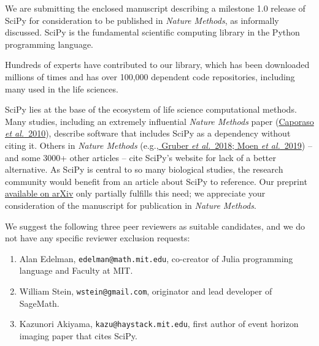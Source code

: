 \documentclass[10pt,stdletter,dateno]{newlfm}
\begin{document}
\begin{newlfm}

We are submitting the enclosed manuscript describing a milestone
1.0 release of SciPy for consideration to be published in
\emph{Nature Methods}, as informally discussed.
SciPy is the fundamental scientific 
computing library in the Python programming language. 

Hundreds of experts have contributed to our library, which
has been downloaded millions of times and has over 100,000 dependent
code repositories, including many used in the life sciences.

SciPy lies at the base of the ecosystem of life science computational
methods. Many studies, including an extremely influential \emph{Nature 
Methods} paper (\href{https://www.nature.com/articles/nmeth.f.303}
{Caporaso \emph{et al.}~2010}), describe software that 
includes SciPy as a dependency without citing it. Others in \emph{
Nature Methods} (e.g.,\href{https://www.nature.com/articles/s41592-018-0114-z}{
Gruber \emph{et al.}~2018};\href{https://www.nature.com/articles/s41592-019-0403-1}{
Moen \emph{et al.}~2019}) -- and some 3000+ other articles -- 
cite SciPy's website for lack of
a better alternative. As SciPy is central to so many biological studies,
the research community would benefit from an article about SciPy to reference.
Our preprint \href{https://arxiv.org/abs/1907.10121}{available on arXiv} 
only partially fulfills this need; we appreciate your consideration of
the manuscript for publication in \emph{Nature Methods}.

We suggest the following three peer reviewers as suitable candidates,
and we do not have any specific reviewer exclusion requests:

\begin{enumerate}
    \item Alan Edelman, \texttt{edelman@math.mit.edu}, co-creator of Julia
    programming language and Faculty at MIT.
    \item William Stein, \texttt{wstein@gmail.com}, originator and
    lead developer of SageMath.
    \item Kazunori Akiyama, \texttt{kazu@haystack.mit.edu}, first author
    of event horizon imaging paper that cites SciPy.
\end{enumerate}

\end{newlfm}
\end{document}
